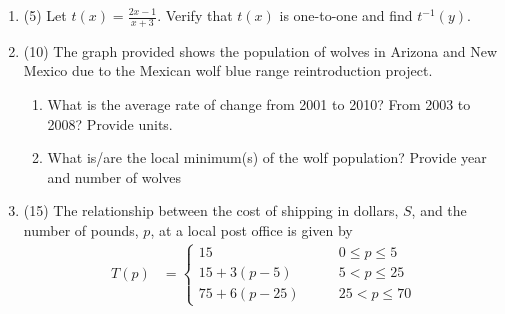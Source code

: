 \documentclass[fleqn]{article}
\renewcommand{\thispagestyle}[1]{}
\begin{document}
\begin{enumerate}
\item (5) Let $t(x) = \frac{2x-1}{x+3}$. Verify that $t(x)$ is one-to-one and find $t^{-1}(y)$.
\vspace{2in}

\pagebreak
\thispagestyle{fancy}{
\lhead{}
}

\item (10) The graph provided shows the population of wolves in Arizona and New Mexico due to the Mexican wolf blue range reintroduction project.


\begin{enumerate}
\item What is the average rate of change from 2001 to 2010? From 2003 to 2008? Provide units.
\vspace{1.5in}

\item What is/are the local minimum(s) of the wolf population? Provide year and number of wolves
\vspace{1in}

\end{enumerate}

\pagebreak
\thispagestyle{fancy}{
\lhead{}
}

\item (15) The relationship between the cost of shipping in dollars, $S$, and the number of pounds, $p$, at a local post office is given by 
\begin{align*}
T(p) &= \begin{cases}
15  & \qquad 0 \leq p \leq 5 \\
15 + 3(p - 5) & \qquad 5 < p \leq 25 \\
75 + 6(p - 25) & \qquad 25 < p \leq 70
\end{cases}
\end{align*}
\begin{enumerate}


\end{enumerate}
\end{enumerate}
\end{document}
